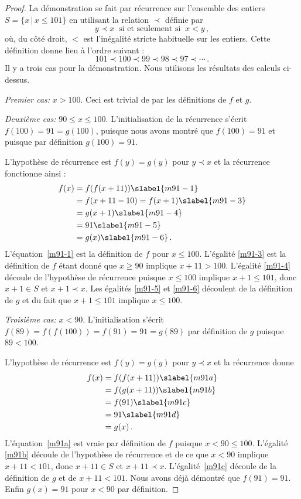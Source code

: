 \begin{proof}
La démonstration se fait par récurrence sur l'ensemble des entiers $S=\{x\,|\,x\leq 101\}$ en utilisant la  relation $\prec$ définie par 
\[
y \prec x \;\; \textrm{si et seulement si}\;\; x < y\,,
\]
où, du côté droit,  $<$ est l'inégalité stricte habituelle  sur les entiers.
Cette définition donne lieu à l'ordre suivant :
\[
101 \prec 100 \prec 99 \prec 98 \prec 97 \prec \cdots\,.
\]
Il y a trois cas pour la démonstration. Nous utilisons les résultats des calculs ci-dessus.

\textit{Premier cas:}
$x > 100$. Ceci est trivial de par les définitions de $f$ et $g$.

\textit{Deuxième cas:}
$90\leq x \leq 100$. L'initialisation de la récurrence s'écrit
$
f(100) =  91 = g(100)$, puisque nous avons montré que $f(100)=91$ et puisque par définition $g(100)=91$.

L'hypothèse de récurrence est $f(y) = g(y)$ pour $y\prec x$ et la récurrence fonctionne ainsi :
\begin{subequations}
\begin{align}
f(x) &= f(f(x+11))\slabel{m91-1}\\
&= f(x+11-10)= f(x+1)\slabel{m91-3}\\
&= g(x+1)\slabel{m91-4}\\
&= 91\slabel{m91-5}\\
&= g(x)\slabel{m91-6}\,.
\end{align}
\end{subequations}
L'équation~\ref{m91-1} est la définition de $f$ pour $x\leq 100$.
L'égalité  \ref{m91-3} est la définition de $f$ étant donné que $x \geq 90$ implique $x+11 > 100$. L'égalité  \ref{m91-4} découle de l'hypothèse de récurrence puisque $x\leq 100$ implique  $x+1 \leq 101$, donc $x+1\in S$ et $x+1\prec x$. Les égalités  \ref{m91-5} et \ref{m91-6} découlent de la définition de $g$ et du fait que  $x+1 \leq 101$ implique $x \leq 100$.

\textit{Troisième cas:}
$x< 90$. L'initialisation s'écrit 
$f(89) = f(f(100)) = f(91) = 91 = g(89)$ 
par définition de $g$ puisque $89<100$.

L'hypothèse de récurrence est $f(y) = g(y)$ pour $y\prec x$ et la récurrence donne
\begin{subequations}
\begin{align}
f(x) &= f(f(x+11))\slabel{m91a}\\
&= f(g(x+11))\slabel{m91b}\\
&= f(91)\slabel{m91c}\\
&= 91\slabel{m91d}\\
&= g(x)\,.
\end{align}
\end{subequations}
L'équation~\ref{m91a} est vraie par définition de $f$  puisque $x<90\leq 100$.
L'égalité  \ref{m91b} découle de l'hypothèse de récurrence  et de ce que $x < 90$ implique $x+11< 101$, donc $x+11\in S$ et $x+11 \prec x$. L'égalité~\ref{m91c} découle de la définition de $g$ et de $x+11 < 101$. Nous avons déjà démontré que $f(91)=91$. Enfin  $g(x)=91$ pour $x<90$ par définition.
\end{proof}


